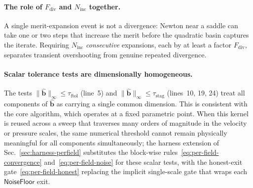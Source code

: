 \documentclass{article}
\newcommand{\textftol}{\tau_{\mathrm{ftol}}}
\newcommand{\textstag}{\tau_{\mathrm{stag}}}
\begin{document}
\paragraph{The role of $F_{\mathrm{div}}$ and $N_{\mathrm{inc}}$ together.}
A single merit-expansion event is not a divergence: Newton near a
saddle can take one or two steps that increase the merit before the
quadratic basin captures the iterate. Requiring $N_{\mathrm{inc}}$
\emph{consecutive} expansions, each by at least a factor
$F_{\mathrm{div}}$, separates transient overshooting from genuine
repeated divergence.

\paragraph{Scalar tolerance tests are dimensionally homogeneous.}
The tests $\|\hat{\boldsymbol{b}}\|_{\infty}\le\textftol$ (line~5)
and $\|\hat{\boldsymbol{b}}\|_{\infty}\le\textstag$ (lines~10, 19, 24)
treat all components of $\hat{\boldsymbol{b}}$ as carrying a single
common dimension. This is consistent with the core algorithm, which
operates at a fixed parametric point. When this kernel is reused
across a sweep that traverses many orders of magnitude in the
velocity or pressure scales, the same numerical threshold cannot
remain physically meaningful for all components simultaneously; the
harness extension of Sec.~\ref{sec:harness-perfield} substitutes the
block-wise rules~\eqref{eq:per-field-convergence}
and~\eqref{eq:per-field-noise} for these scalar tests, with the
honest-exit gate~\eqref{eq:per-field-honest} replacing the implicit
single-scale gate that wraps each $\mathsf{NoiseFloor}$ exit.
\end{document}
